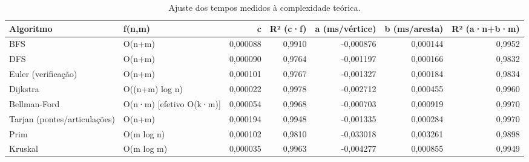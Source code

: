\begin{table}[ht]
\centering
\caption{Ajuste dos tempos medidos à complexidade teórica.}
\label{tab:ajustes}
\small
\begin{tabular}{llrrrrr}
\hline
Algoritmo & f(n,m) & c & R² (c·f) & a (ms/vértice) & b (ms/aresta) & R² (a·n+b·m) \\
\hline
BFS & O(n+m) & 0,000088 & 0,9910 & -0,000876 & 0,000144 & 0,9952 \\
DFS & O(n+m) & 0,000090 & 0,9764 & -0,001197 & 0,000166 & 0,9832 \\
Euler (verificação) & O(n+m) & 0,000101 & 0,9767 & -0,001327 & 0,000184 & 0,9834 \\
Dijkstra & O((n+m) log n) & 0,000022 & 0,9978 & -0,002712 & 0,000455 & 0,9960 \\
Bellman-Ford & O(n·m) [efetivo O(k·m)] & 0,000054 & 0,9968 & -0,000703 & 0,000919 & 0,9970 \\
Tarjan (pontes/articulações) & O(n+m) & 0,000194 & 0,9948 & -0,001335 & 0,000284 & 0,9970 \\
Prim & O(m log n) & 0,000102 & 0,9810 & -0,033018 & 0,003261 & 0,9898 \\
Kruskal & O(m log m) & 0,000035 & 0,9963 & -0,004277 & 0,000855 & 0,9949 \\
\hline
\end{tabular}
\end{table}
